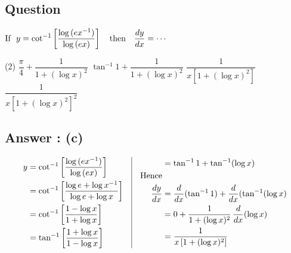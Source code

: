 \documentclass[17pt]{extarticle}
\begin{document}
\noindent
\begin{fleqn} 


\section{Question} 

$\begin{aligned}[t] 
\text{If \ } y = \cot^{-1} \left[ \frac{\log \, (ex^{-1})}{\log\,(ex)} \right] \text{\quad then\quad}
\frac{dy}{dx} = \cdots 
\end{aligned}$

\begin{tasks}(2)
  \task $\dfrac{\pi}{4} + \dfrac{1}{1+ (\log x)^2}$ 
  \task $\tan^{-1}1 + \dfrac{1}{1+ (\log x)^2}$ 
  \task $\dfrac{1}{x\left[1+ (\log x)^2\right]}$ 
  \task $\dfrac{1}{x\left[1+ (\log x)^2\right]^2}$ 
\end{tasks}
\subsection*{Answer : (c)}
\begin{equation} \nonumber
\begin{alignedat}{4}
y &= \cot^{-1} \left[ \frac{\log \, (ex^{-1})}{\log\,(ex)} \right]\\
&= \cot^{-1} \left[ \frac{\log e + \log x^{-1}}{\log e + \log x} \right]\\
&= \cot^{-1} \left[ \frac{1 - \log x}{1 + \log x} \right]\\
&= \tan^{-1} \left[ \frac{1 + \log x}{1 - \log x} \right]\\
\end{alignedat}
\quad
\vrule
\quad
\begin{alignedat}{4}
&= \tan^{-1}1 + \tan^{-1}(\log x)\\
\text{Hence}\\ 
\frac{dy}{dx} &= \frac{d}{dx}(\tan^{-1}1)+\frac{d}{dx}(\tan^{-1}(\log x) \\
&= 0 + \frac {1}{1 + (\log x)^2}\, \frac{d}{dx}(\log x) \\
&= \frac {1}{x\left[1 + (\log x)^2 \right]}\\
\end{alignedat}
\end{equation}


\end{fleqn}
\end{document}
